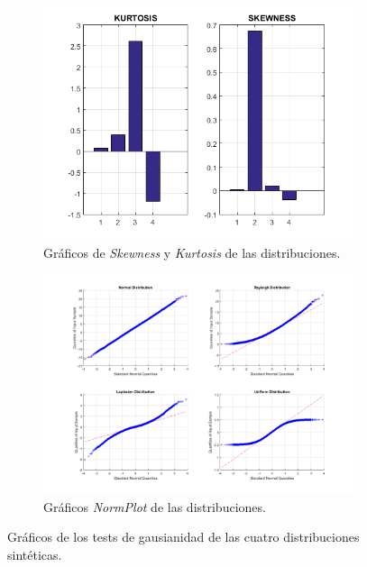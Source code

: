 \documentclass[11pt]{article} %
\begin{document}
\begin{figure}[h]
\begin{subfigure}[b]{0.475 \textwidth}
		\centering 
		\includegraphics[width=\textwidth]{./22/kurtosis_skewness.png}
		\caption[]{{\small Gráficos de \emph{Skewness} y \emph{Kurtosis} de las distribuciones.}}    
		\label{fig:22:skew_kurt}
	\end{subfigure}
	\quad
	\begin{subfigure}[b]{0.475 \textwidth}   
		\centering 
		\includegraphics[width=\textwidth]{./22/normplot.png}
		\caption[]{{\small Gráficos \emph{NormPlot} de las distribuciones.}}    
		\label{fig:22:normplot}
	\end{subfigure}
	\caption[]{\small Gráficos de los tests de gausianidad de las cuatro distribuciones sintéticas.} 
	\label{fig:22:distributions}
\end{figure}
\end{document}
